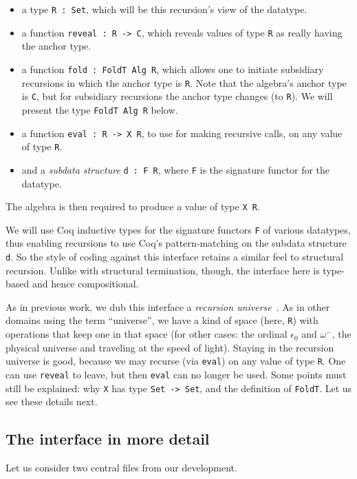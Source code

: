\documentclass[a4paper,USenglish]{lipics-v2021}
\begin{document}
\begin{itemize}
\item a type \verb|R : Set|, which will be this recursion's view of the datatype.
\item a function \verb|reveal : R -> C|, which reveals values of type \verb|R| as really having the anchor type.  
\item a function \verb|fold : FoldT Alg R|, which allows one to initiate subsidiary recursions in which the anchor type is \verb|R|.  Note that the algebra's anchor type is \verb|C|, but for subsidiary recursions the anchor type changes (to \verb|R|). We will present the type \verb|FoldT Alg R| below.
\item a function \verb|eval : R -> X R|, to use for making recursive calls, on any value of type \verb|R|.
\item and a \emph{subdata structure} \verb|d : F R|, where \verb|F| is the signature functor for the datatype.
\end{itemize}

\noindent The algebra is then required to produce a value of type \verb|X R|.

We will use Coq inductive types for the signature functors \verb|F| of
various datatypes, thus enabling recursions to use Coq's
pattern-matching on the subdata structure \verb|d|.  So the style of
coding against this interface retains a similar feel to structural
recursion.  Unlike with structural termination, though, the interface
here is type-based and hence compositional.  

As in previous work, we dub this interface a \emph{recursion
universe}~\cite{stump20}.  As in other domains using the term
``universe'', we have a kind of space (here, \verb|R|) with operations
that keep one in that space (for other cases: the ordinal $\epsilon_0$
and $\omega^-$, the physical universe and traveling at the speed of
light).  Staying in the recursion universe is good, because we may
recurse (via \verb|eval|) on any value of type \verb|R|.  One can
use \verb|reveal| to leave, but then \verb|eval| can no longer be used. Some points
must still be explained: why \verb|X| has type \verb|Set -> Set|, and
the definition of \verb|FoldT|.  Let us see these details next.

\subsection{The interface in more detail}

Let us consider two central files from our development.
\end{document}
